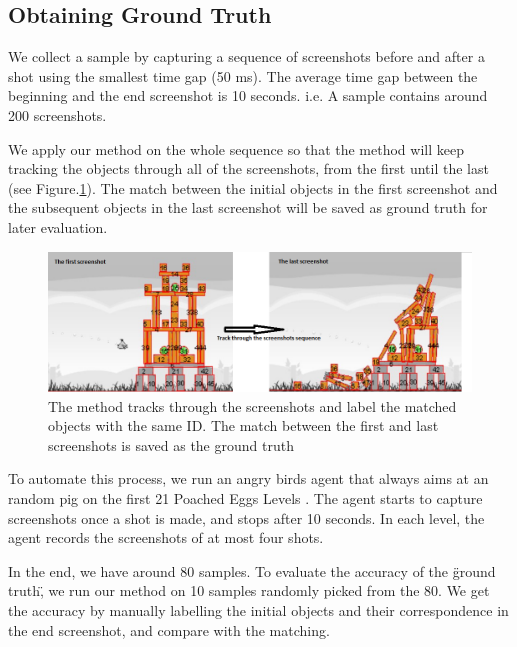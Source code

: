 \documentclass[letterpaper]{article}
\begin{document}
 
\subsection{Obtaining Ground Truth}

We collect a sample by capturing a sequence of screenshots before and after a shot using the smallest time gap (50 ms). The average time gap between the beginning and the end screenshot is 10 seconds. i.e. A sample contains around 200 screenshots.  

We apply our method on the whole sequence so that the method will keep tracking the objects through all of the screenshots, from the first until the last (see Figure.\ref{Tracking}). The match between the initial objects in the first screenshot and the subsequent objects in the last screenshot will be saved as ground truth for later evaluation. 

\begin{figure}[h!]
\centering\includegraphics[scale=0.32]{TrackingBackup.png}\caption{The method tracks through the screenshots and label the matched objects with the same ID. The match between the first and last screenshots is saved as the ground truth }
\label{Tracking}
\end{figure}

To automate this process, we run an angry birds agent that always aims at an random pig on the first 21 Poached Eggs Levels \cite{AngryBirdsLevels}. The agent starts to capture screenshots once a shot is made, and stops after 10 seconds. In each level, the agent records the screenshots of at most four shots.

In the end, we have around 80 samples. To evaluate the accuracy of the \"ground truth\", we run our method on 10 samples randomly picked from the 80. We get the accuracy by manually labelling the initial objects and their correspondence in the end screenshot, and compare with the matching. 
\end{document}
